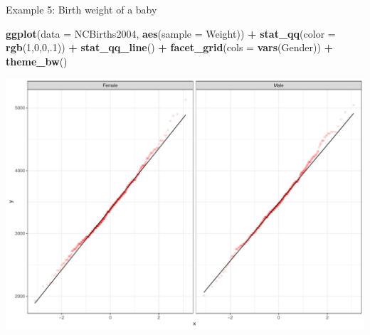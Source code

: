 \documentclass[
  ignorenonframetext,
]{beamer}
\newenvironment{Shaded}{\begin{snugshade}}{\end{snugshade}}
\newcommand{\AttributeTok}[1]{\textcolor[rgb]{0.13,0.29,0.53}{#1}}
\newcommand{\DecValTok}[1]{\textcolor[rgb]{0.00,0.00,0.81}{#1}}
\newcommand{\FunctionTok}[1]{\textcolor[rgb]{0.13,0.29,0.53}{\textbf{#1}}}
\newcommand{\NormalTok}[1]{#1}
\newcommand{\SpecialCharTok}[1]{\textcolor[rgb]{0.81,0.36,0.00}{\textbf{#1}}}
\begin{document}
\begin{frame}[fragile]{Example 5: Birth weight of a baby}
\protect\hypertarget{example-5-birth-weight-of-a-baby-3}{}
\tiny

\begin{Shaded}
\begin{Highlighting}[]
\FunctionTok{ggplot}\NormalTok{(}\AttributeTok{data =}\NormalTok{ NCBirths2004, }\FunctionTok{aes}\NormalTok{(}\AttributeTok{sample =}\NormalTok{ Weight)) }\SpecialCharTok{+} 
  \FunctionTok{stat\_qq}\NormalTok{(}\AttributeTok{color =} \FunctionTok{rgb}\NormalTok{(}\DecValTok{1}\NormalTok{,}\DecValTok{0}\NormalTok{,}\DecValTok{0}\NormalTok{,.}\DecValTok{1}\NormalTok{)) }\SpecialCharTok{+} 
  \FunctionTok{stat\_qq\_line}\NormalTok{() }\SpecialCharTok{+}
  \FunctionTok{facet\_grid}\NormalTok{(}\AttributeTok{cols =} \FunctionTok{vars}\NormalTok{(Gender)) }\SpecialCharTok{+} 
  \FunctionTok{theme\_bw}\NormalTok{()}
\end{Highlighting}
\end{Shaded}

\begin{center}\includegraphics[width=0.7\linewidth,height=0.5\textheight]{Week10_Lect_files/figure-beamer/unnamed-chunk-59-1} \end{center}
\normalsize
\end{frame}
\end{document}
